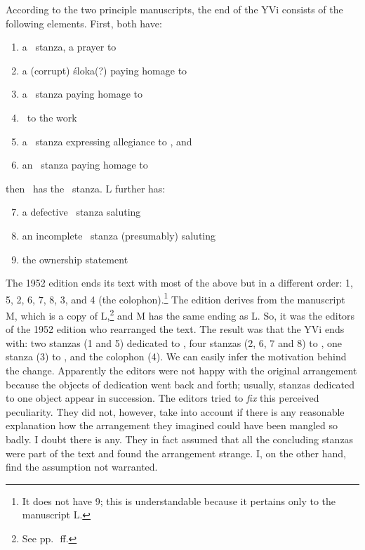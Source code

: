 According to the two principle manuscripts, the end of the YVi consists of the following elements. First, both have:
\begin{enumerate}
\item a \sragdhara\ stanza, a prayer to \Krsna
\item a (corrupt) śloka(?) paying homage to \Patanjali
\item a \viyogini\ stanza paying homage to \Sankara
\item \colophon\ to the work
\item a \vasantatilaka\ stanza expressing allegiance to \Visnu, and 
\item an \upajati\ stanza paying homage to \Patanjali
\end{enumerate}
then \Tm\ has the \colophon\ stanza. L further has:
\begin{enumerate}
\setcounter{enumi}{6}
\item a defective \arya\ stanza saluting \Patanjali
\item an incomplete \rathoddhata\ stanza (presumably) saluting \Patanjali
\item the ownership statement
\end{enumerate}
The 1952 edition ends its text with most of the above but in a different order: 1, 5, 2, 6, 7, 8, 3, and 4 (the colophon).\footnote{It does not have 9; this is understandable because it pertains only to the manuscript L\@.} The edition derives from the manuscript M, which is a copy of L,\footnote{See pp.~\pageref{l2m2a}\,ff.} and M has the same ending as L\@. So, it was the editors of the 1952 edition who rearranged the text. The result was that the YVi ends with: two stanzas (1 and 5) dedicated to \Visnu, four stanzas (2, 6, 7 and 8) to \Patanjali, one stanza (3) to \Sankara, and the colophon (4). We can easily infer the motivation behind the change. Apparently the editors were not happy with the original arrangement because the objects of dedication went back and forth; usually, stanzas dedicated to one object appear in succession. The editors tried to \emph{fix} this perceived peculiarity. They did not, however, take into account if there is any reasonable explanation how the arrangement they imagined could have been mangled so badly. I doubt there is any. They in fact assumed that all the concluding stanzas were part of the text and found the arrangement strange. I, on the other hand, find the assumption not warranted. 

